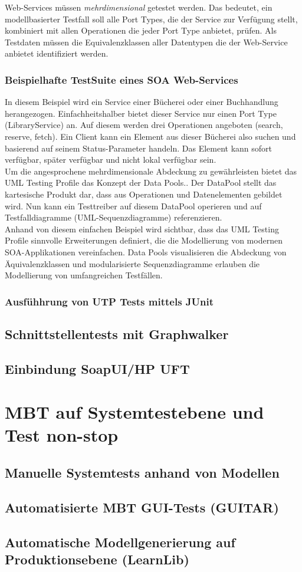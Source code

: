 Web-Services müssen \textit{mehrdimensional} getestet werden\cite{_model-driven_2007}. Das bedeutet, ein modellbasierter Testfall soll alle Port Types, die der Service zur Verfügung stellt, kombiniert mit allen Operationen die jeder Port Type anbietet, prüfen. Als Testdaten müssen die Equivalenzklassen aller Datentypen die der Web-Service anbietet identifiziert werden.

\subsubsection{Beispielhafte TestSuite eines SOA Web-Services}
 In diesem Beispiel wird ein Service einer Bücherei oder einer Buchhandlung herangezogen. Einfachheitshalber bietet dieser Service nur einen Port Type (LibraryService) an. Auf diesem werden drei Operationen angeboten (search, reserve, fetch). Ein Client kann ein Element aus dieser Bücherei also suchen und basierend auf seinem Status-Parameter handeln. Das Element kann sofort verfügbar, später verfügbar und nicht lokal verfügbar sein.\\

Um die angesprochene mehrdimensionale Abdeckung zu gewährleisten bietet das UML Testing Profile das Konzept der Data Pools.. Der DataPool stellt das kartesische Produkt dar, dass aus Operationen und Datenelementen gebildet wird. Nun kann ein Testtreiber auf diesem DataPool operieren und auf Testfalldiagramme (UML-Sequenzdiagramme) referenzieren.\\
Anhand von diesem einfachen Beispiel wird sichtbar, dass das UML Testing Profile sinnvolle Erweiterungen definiert, die die Modellierung von modernen SOA-Applikationen vereinfachen. Data Pools visualisieren die Abdeckung von Äquivalenzklassen und modularisierte Sequenzdiagramme erlauben die Modellierung von umfangreichen Testfällen. 


\subsubsection{Ausfühhrung von UTP Tests mittels JUnit}

\subsection{Schnittstellentests mit Graphwalker}
\subsection{Einbindung SoapUI/HP UFT}


\section{MBT auf Systemtestebene und Test non-stop}
\subsection{Manuelle Systemtests anhand von Modellen}
\subsection{Automatisierte MBT GUI-Tests (GUITAR)}
\subsection{Automatische Modellgenerierung auf Produktionsebene (LearnLib)}

